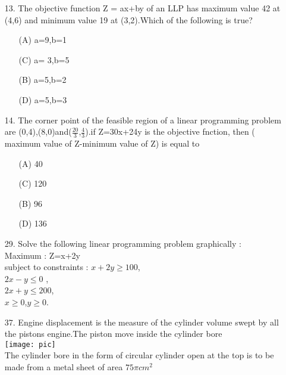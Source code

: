 \documentclass{article}
\newcommand\tab[1][1cm]{\hspace*{#1}}
\begin{document}
\begin{enumerate}
	\item[13.] The objective function Z = ax+by of an LLP has maximum value 42 at (4,6) and minimum value 19 at (3,2).Which of the following is true?
		\begin{multicols}{2}
			\begin{enumerate}
				\item[(A)] a=9,b=1
				\item[(C)] a= 3,b=5
				\item[(B)] a=5,b=2
				\item[(D)] a=5,b=3
			\end{enumerate}
		\end{multicols}
		
	\item[14.] The corner point of the feasible region of a linear programming problem are (0,4),(8,0)and($\frac{20}{3}$,$\frac{4}{3}$).if Z=30x+24y is the objective fnction, then ( maximum value of Z-minimum value of Z) is equal to 
		\begin{multicols}{2}
			\begin{enumerate}
				\item[(A)] 40
				\item[(C)] 120
				\item[(B)] 96
				\item[(D)] 136
			\end{enumerate}
		\end{multicols}
		
	\item[29.]
	 Solve the following linear programming problem graphically : \\
		Maximum : Z=x+2y \\
		subject to constraints  :  $ x+2y \ge 100 $,\\
		\tab[3.5cm]   $ 2x-y \le 0 $ , \\
		\tab[3.5cm]   $ 2x+y \le 200 $, \\
		\tab[3.5cm]   $ x \ge 0 $,$ y \ge 0 $.
					

			      \item[37.]
		Engine displacement is the measure of the cylinder volume swept by all the pistons engine.The piston move inside the cylinder bore \\
		
		\texttt{[image: pic]}\\
	
		The cylinder bore in the form of circular cylinder open at the top is to be made from a metal sheet of area $ 75 \pi cm^2 $ \\
		

\end{enumerate}
\end{document}
